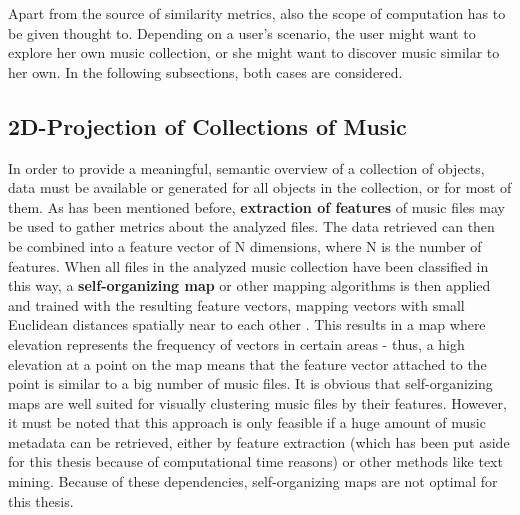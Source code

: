 Apart from the source of similarity metrics, also the scope of computation has to be given thought to. Depending on a user's scenario, the user might want to explore her own music collection, or she might want to discover music similar to her own. In the following subsections, both cases are considered.

\subsection{2D-Projection of Collections of Music}
\label{subsec:2dprojection}

In order to provide a meaningful, semantic overview of a collection of objects, data must be available or generated for all objects in the collection, or for most of them. 
As has been mentioned before, \textbf{extraction of features} of music files may be used to gather metrics about the analyzed files. The data retrieved can then be combined into a feature vector of N dimensions, where N is the number of features. When all files in the analyzed music collection have been classified in this way, a \textbf{self-organizing map} or other mapping algorithms is then applied and trained with the resulting feature vectors, mapping vectors with small Euclidean distances spatially near to each other \cite{RAU-02ismir}. This results in a map where elevation represents the frequency of vectors in certain areas - thus, a high elevation at a point on the map means that the feature vector attached to the point is similar to a big number of music files. It is obvious that self-organizing maps are well suited for visually clustering music files by their features. However, it must be noted that this approach is only feasible if a huge amount of music metadata 
can be retrieved, either by feature extraction (which has been put aside for this thesis because of computational time reasons) or other methods like text mining. Because of these dependencies, self-organizing maps are not optimal for this thesis. 

